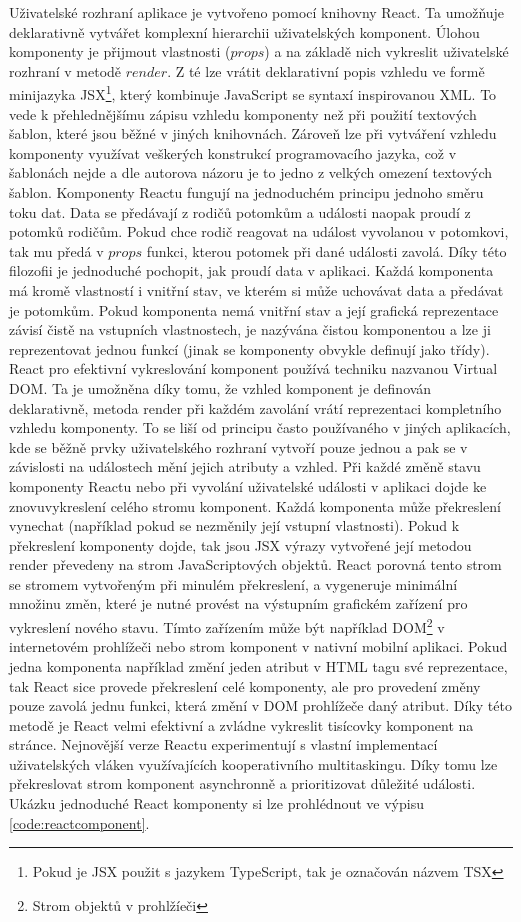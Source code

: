 Uživatelské rozhraní aplikace je vytvořeno pomocí knihovny React. Ta umožňuje deklarativně vytvářet komplexní hierarchii uživatelských komponent. Úlohou komponenty je přijmout vlastnosti ($props$) a na základě nich vykreslit uživatelské rozhraní v metodě $render$. Z té lze vrátit deklarativní popis vzhledu ve formě minijazyka JSX\footnote{Pokud je JSX použit s jazykem TypeScript, tak je označován názvem TSX}, který kombinuje JavaScript se syntaxí inspirovanou XML. To vede k přehlednějšímu zápisu vzhledu komponenty než při použití textových šablon, které jsou běžné v jiných knihovnách. Zároveň lze při vytváření vzhledu komponenty využívat veškerých konstrukcí programovacího jazyka, což v šablonách nejde a dle autorova názoru je to jedno z velkých omezení textových šablon. Komponenty Reactu fungují na jednoduchém principu jednoho směru toku dat. Data se předávají z rodičů potomkům a události naopak proudí z potomků rodičům. Pokud chce rodič reagovat na událost vyvolanou v potomkovi, tak mu předá v $props$ funkci, kterou potomek při dané události zavolá. Díky této filozofii je jednoduché pochopit, jak proudí data v aplikaci. Každá komponenta má kromě vlastností i vnitřní stav, ve kterém si může uchovávat data a předávat je potomkům. Pokud komponenta nemá vnitřní stav a její grafická reprezentace závisí čistě na vstupních vlastnostech, je nazývána čistou komponentou a lze ji reprezentovat jednou funkcí (jinak se komponenty obvykle definují jako třídy).
React pro efektivní vykreslování komponent používá techniku nazvanou Virtual DOM. Ta je umožněna díky tomu, že vzhled komponent je definován deklarativně, metoda render při každém zavolání vrátí reprezentaci kompletního vzhledu komponenty. To se liší od principu často používaného v jiných aplikacích, kde se běžně prvky uživatelského rozhraní vytvoří pouze jednou a pak se v závislosti na událostech mění jejich atributy a vzhled. Při každé změně stavu komponenty Reactu nebo při vyvolání uživatelské události v aplikaci dojde ke znovuvykreslení celého stromu komponent. Každá komponenta může překreslení vynechat (například pokud se nezměnily její vstupní vlastnosti). Pokud k překreslení komponenty dojde, tak jsou JSX výrazy vytvořené její metodou render převedeny na strom JavaScriptových objektů. React porovná tento strom se stromem vytvořeným při minulém překreslení, a vygeneruje minimální množinu změn, které je nutné provést na výstupním grafickém zařízení pro vykreslení nového stavu. Tímto zařízením může být například DOM\footnote{Strom objektů v prohlžíeči} v internetovém prohlížeči nebo strom komponent v nativní mobilní aplikaci. Pokud jedna komponenta například změní jeden atribut v HTML tagu své reprezentace, tak React sice provede překreslení celé komponenty, ale pro provedení změny pouze zavolá jednu funkci, která změní v DOM prohlížeče daný atribut.  Díky této metodě je React velmi efektivní a zvládne vykreslit tisícovky komponent na stránce. Nejnovější verze Reactu experimentují s vlastní implementací uživatelských vláken využívajících kooperativního multitaskingu. Díky tomu lze překreslovat strom komponent asynchronně a prioritizovat důležité události. Ukázku jednoduché React komponenty si lze prohlédnout ve výpisu \ref{code:reactcomponent}.

